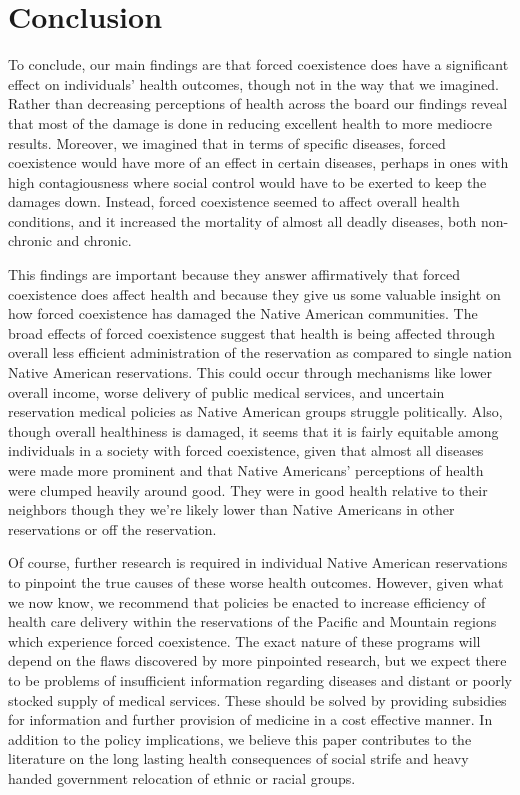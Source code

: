 \documentclass[12pt]{article}
\begin{document}
\section{Conclusion}
To conclude, our main findings are that forced coexistence does have a significant effect on individuals’ health outcomes, though not in the way that we imagined.  
Rather than decreasing perceptions of health across the board our findings reveal that most of the damage is done in reducing excellent health to more mediocre results.  
Moreover, we imagined that in terms of specific diseases, forced coexistence would have more of an effect in certain diseases, perhaps in ones with high contagiousness where social control would have to be exerted to keep the damages down.  
Instead, forced coexistence seemed to affect overall health conditions, and it increased the mortality of almost all deadly diseases, both non-chronic and chronic.

This findings are important because they answer affirmatively that forced coexistence does affect health and because they give us some valuable insight on how forced coexistence has damaged the Native American communities. 
The broad effects of forced coexistence suggest that health is being affected through overall less efficient administration of the reservation as compared to single nation Native American reservations.  
This could occur through mechanisms like lower overall income, worse delivery of public medical services, and uncertain reservation medical policies as Native American groups struggle politically. 
Also, though overall healthiness is damaged, it seems that it is fairly equitable among individuals in a society with forced coexistence, given that almost all diseases were made more prominent and that Native Americans’ perceptions of health were clumped heavily around good. 
They were in good health relative to their neighbors though they we’re likely lower than Native Americans in other reservations or off the reservation.  

Of course, further research is required in individual Native American reservations to pinpoint the true causes of these worse health outcomes. 
However, given what we now know, we recommend that policies be enacted to increase efficiency of health care delivery within the reservations of the Pacific and Mountain regions which experience forced coexistence. 
The exact nature of these programs will depend on the flaws discovered by more pinpointed research, but we expect there to be problems of insufficient information regarding diseases and distant or poorly stocked supply of medical services. 
These should be solved by providing subsidies for information and further provision of medicine in a cost effective manner. 
In addition to the policy implications, we believe this paper contributes to the literature on the long lasting health consequences of social strife and heavy handed government relocation of ethnic or racial groups.


\newpage


\end{document}
